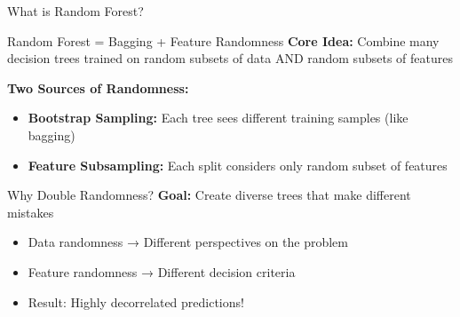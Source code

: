 \documentclass[8pt]{beamer}
\begin{document}
\begin{frame}{What is Random Forest?}
\begin{definitionbox}{Random Forest = Bagging + Feature Randomness}
\textbf{Core Idea:} Combine many decision trees trained on random subsets of data AND random subsets of features
\end{definitionbox}

\begin{keypointsbox}
\textbf{Two Sources of Randomness:}
\begin{itemize}
\item \textbf{Bootstrap Sampling:} Each tree sees different training samples (like bagging)
\item \textbf{Feature Subsampling:} Each split considers only random subset of features
\end{itemize}
\end{keypointsbox}

\begin{examplebox}{Why Double Randomness?}
\textbf{Goal:} Create diverse trees that make different mistakes
\begin{itemize}
\item Data randomness → Different perspectives on the problem
\item Feature randomness → Different decision criteria
\item Result: Highly decorrelated predictions!
\end{itemize}
\end{examplebox}
\end{frame}
\end{document}
